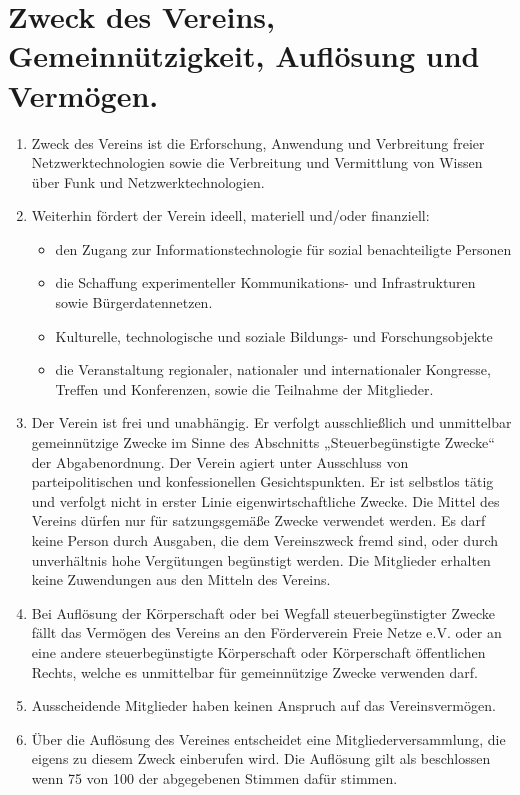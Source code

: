 \documentclass[12pt,a4paper,titlepage]{scrartcl}
\begin{document}
\section{Zweck des Vereins, Gemeinnützigkeit, Auflösung und Vermögen.}
\begin{enumerate}
\item Zweck des Vereins ist die Erforschung, Anwendung und Verbreitung freier 
Netzwerktechnologien sowie die Verbreitung und Vermittlung von Wissen über Funk und 
Netzwerktechnologien. 
\item Weiterhin fördert der Verein ideell, materiell und/oder finanziell:
\begin{itemize}
\item den Zugang zur Informationstechnologie für sozial benachteiligte Personen 
\item  die Schaffung experimenteller Kommunikations- und Infrastrukturen sowie 
Bürgerdatennetzen. 
\item Kulturelle, technologische und soziale Bildungs- und Forschungsobjekte 
\item die Veranstaltung regionaler, nationaler und internationaler Kongresse, Treffen 
und Konferenzen, sowie die Teilnahme der Mitglieder. 
\end{itemize}
\item Der Verein ist frei und unabhängig. Er verfolgt ausschließlich und unmittelbar 
gemeinnützige Zwecke im Sinne des Abschnitts „Steuerbegünstigte Zwecke“ der 
Abgabenordnung. Der Verein agiert unter Ausschluss von parteipolitischen und konfessionellen Gesichtspunkten. Er ist selbstlos tätig und verfolgt nicht in erster Linie eigenwirtschaftliche Zwecke. Die Mittel des Vereins dürfen nur für satzungsgemäße 
Zwecke verwendet werden. Es darf keine Person durch Ausgaben, die dem 
Vereinszweck fremd sind, oder durch unverhältnis hohe Vergütungen begünstigt 
werden. Die Mitglieder erhalten keine Zuwendungen aus den Mitteln des Vereins. 
\item Bei Auflösung der Körperschaft oder bei Wegfall steuerbegünstigter Zwecke fällt das 
Vermögen des Vereins an den Förderverein Freie Netze e.V. oder an eine andere steuerbegünstigte 
Körperschaft oder Körperschaft öffentlichen Rechts, welche es unmittelbar für 
gemeinnützige Zwecke verwenden darf. 
\item Ausscheidende Mitglieder haben keinen Anspruch auf das Vereinsvermögen. 
\item Über die Auflösung des Vereines entscheidet eine Mitgliederversammlung, die eigens 
zu diesem Zweck einberufen wird. Die Auflösung gilt als beschlossen wenn 75 von 100 
der abgegebenen Stimmen dafür stimmen.
\end{enumerate}
\end{document}
